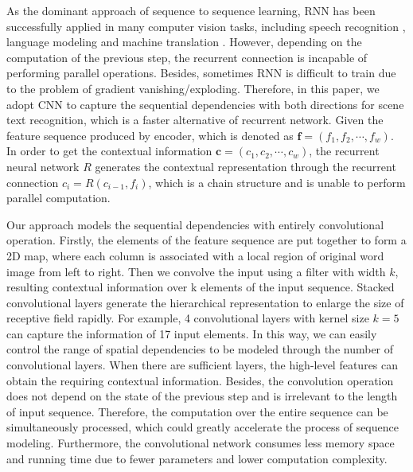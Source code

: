 \documentclass[letterpaper]{article} %
\begin{document}
As the dominant approach of sequence to sequence learning, RNN has been successfully applied in many computer vision tasks, including speech recognition \cite{hannun2014deep,miao2013deep}, language modeling \cite{jozefowicz2016exploring} and machine translation \cite{luong2014addressing}. However, depending on the computation of the previous step, the recurrent connection is incapable of performing parallel operations. Besides, sometimes RNN is difficult to train due to the problem of gradient vanishing/exploding. Therefore, in this paper, we adopt CNN to capture the sequential dependencies with both directions for scene text recognition, which is a faster alternative of recurrent network. Given the feature sequence produced by encoder, which is denoted as $\textbf{f} = (f_{1}, f_{2}, \cdots, f_{w})$. In order to get the contextual information $\textbf{c} = (c_{1}, c_{2}, \cdots, c_{w})$, the recurrent neural network $R$ generates the contextual representation through the recurrent connection $c_{i} = R(c_{i-1}, f_{i})$, which is a chain structure and is unable to perform parallel computation. \par

Our approach models the sequential dependencies with entirely convolutional operation. Firstly, the elements of the feature sequence are put together to form a 2D map, where each column is associated with a local region of original word image from left to right. Then we convolve the input using a filter with width $k$, resulting contextual information over k elements of the input sequence. Stacked convolutional layers generate the hierarchical representation to enlarge the size of receptive field rapidly. For example, 4 convolutional layers with kernel size $k=5$ can capture the information of 17 input elements. In this way, we can easily control the range of spatial dependencies to be modeled through the number of convolutional layers. When there are sufficient layers, the high-level features can obtain the requiring contextual information. Besides, the convolution operation does not depend on the state of the previous step and is irrelevant to the length of input sequence. Therefore, the computation over the entire sequence can be simultaneously processed, which could greatly accelerate the process of sequence modeling. Furthermore, the convolutional network consumes less memory space and running time due to fewer parameters and lower computation complexity.
\end{document}
